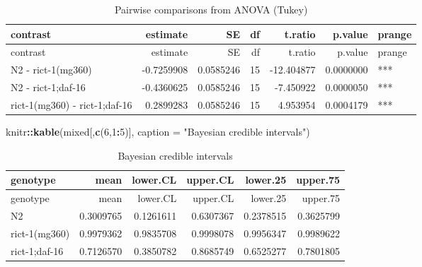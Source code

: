 \documentclass[]{article}
\newenvironment{Shaded}{\begin{snugshade}}{\end{snugshade}}
\newcommand{\KeywordTok}[1]{\textcolor[rgb]{0.13,0.29,0.53}{\textbf{#1}}}
\newcommand{\DataTypeTok}[1]{\textcolor[rgb]{0.13,0.29,0.53}{#1}}
\newcommand{\DecValTok}[1]{\textcolor[rgb]{0.00,0.00,0.81}{#1}}
\newcommand{\StringTok}[1]{\textcolor[rgb]{0.31,0.60,0.02}{#1}}
\newcommand{\OperatorTok}[1]{\textcolor[rgb]{0.81,0.36,0.00}{\textbf{#1}}}
\newcommand{\NormalTok}[1]{#1}
\begin{document}
\begin{longtable}[]{@{}lrrrrrl@{}}
\caption{Pairwise comparisons from ANOVA (Tukey)}\tabularnewline
\toprule
contrast & estimate & SE & df & t.ratio & p.value &
prange\tabularnewline
\midrule
\endfirsthead
\toprule
contrast & estimate & SE & df & t.ratio & p.value &
prange\tabularnewline
\midrule
\endhead
N2 - rict-1(mg360) & -0.7259908 & 0.0585246 & 15 & -12.404877 &
0.0000000 & ***\tabularnewline
N2 - rict-1;daf-16 & -0.4360625 & 0.0585246 & 15 & -7.450922 & 0.0000050
& ***\tabularnewline
rict-1(mg360) - rict-1;daf-16 & 0.2899283 & 0.0585246 & 15 & 4.953954 &
0.0004179 & ***\tabularnewline
\bottomrule
\end{longtable}

\begin{Shaded}
\begin{Highlighting}[]
\NormalTok{knitr}\OperatorTok{::}\KeywordTok{kable}\NormalTok{(mixed[,}\KeywordTok{c}\NormalTok{(}\DecValTok{6}\NormalTok{,}\DecValTok{1}\OperatorTok{:}\DecValTok{5}\NormalTok{)], }\DataTypeTok{caption =} \StringTok{"Bayesian credible intervals"}\NormalTok{)}
\end{Highlighting}
\end{Shaded}

\begin{longtable}[]{@{}lrrrrr@{}}
\caption{Bayesian credible intervals}\tabularnewline
\toprule
genotype & mean & lower.CL & upper.CL & lower.25 &
upper.75\tabularnewline
\midrule
\endfirsthead
\toprule
genotype & mean & lower.CL & upper.CL & lower.25 &
upper.75\tabularnewline
\midrule
\endhead
N2 & 0.3009765 & 0.1261611 & 0.6307367 & 0.2378515 &
0.3625799\tabularnewline
rict-1(mg360) & 0.9979362 & 0.9835708 & 0.9998078 & 0.9956347 &
0.9989622\tabularnewline
rict-1;daf-16 & 0.7126570 & 0.3850782 & 0.8685749 & 0.6525277 &
0.7801805\tabularnewline
\bottomrule
\end{longtable}
\end{document}
